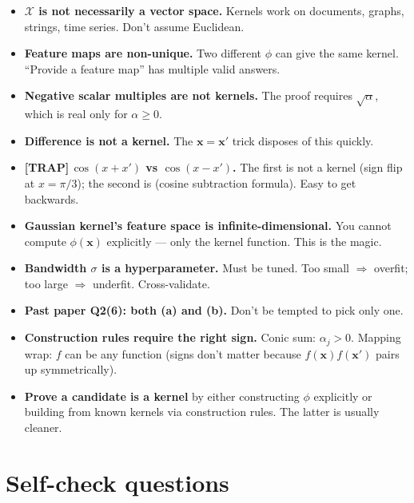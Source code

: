 \documentclass[11pt, a4paper]{article}
\newcommand{\trapflag}{\textcolor{trapBd}{\textbf{[TRAP]}}\,}
\begin{document}
\begin{itemize}
  \item \textbf{$\mathcal{X}$ is not necessarily a vector space.} Kernels work on documents, graphs, strings, time series. Don't assume Euclidean.
  \item \textbf{Feature maps are non-unique.} Two different $\phi$ can give the same kernel. ``Provide a feature map'' has multiple valid answers.
  \item \textbf{Negative scalar multiples are not kernels.} The proof requires $\sqrt{\alpha}$, which is real only for $\alpha \ge 0$.
  \item \textbf{Difference is not a kernel.} The $\mathbf{x} = \mathbf{x}'$ trick disposes of this quickly.
  \item \trapflag{}\textbf{$\cos(x + x')$ vs $\cos(x - x')$.} The first is not a kernel (sign flip at $x = \pi/3$); the second is (cosine subtraction formula). Easy to get backwards.
  \item \textbf{Gaussian kernel's feature space is infinite-dimensional.} You cannot compute $\phi(\mathbf{x})$ explicitly — only the kernel function. This is the magic.
  \item \textbf{Bandwidth $\sigma$ is a hyperparameter.} Must be tuned. Too small $\Rightarrow$ overfit; too large $\Rightarrow$ underfit. Cross-validate.
  \item \textbf{Past paper Q2(6): both (a) and (b).} Don't be tempted to pick only one.
  \item \textbf{Construction rules require the right sign.} Conic sum: $\alpha_j > 0$. Mapping wrap: $f$ can be any function (signs don't matter because $f(\mathbf{x})f(\mathbf{x}')$ pairs up symmetrically).
  \item \textbf{Prove a candidate is a kernel} by either constructing $\phi$ explicitly or building from known kernels via construction rules. The latter is usually cleaner.
\end{itemize}

\section*{Self-check questions}
\end{document}
